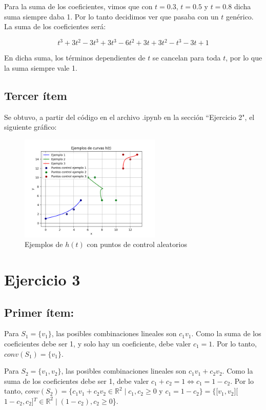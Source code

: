 \documentclass{article}
\begin{document}
Para la suma de los coeficientes, vimos que con $t=0.3$, $t=0.5$ y $t=0.8$ dicha suma siempre daba 1. Por lo tanto decidimos ver que pasaba con un $t$ genérico. La suma de los coeficientes será:

$$
t^3 + 3t^2-3t^3 + 3t^3-6t^2+3t +3t^2-t^3-3t+1
$$

En dicha suma, los términos dependientes de $t$ se cancelan para toda $t$, por lo que la suma siempre vale 1.

\subsection*{Tercer ítem}
Se obtuvo, a partir del código en el archivo .ipynb en la sección ``Ejercicio 2", el siguiente gráfico:

\begin{figure}[H]
    \centering
    \includegraphics[width=0.6\textwidth]{imagenes/graf_2c.png}
    \caption{Ejemplos de $h(t)$ con puntos de control aleatorios}
    \label{fig:ejemplo}
\end{figure}

\section*{Ejercicio 3}

\subsection*{Primer ítem:}
Para $S_1 = \{v_1\}$, las posibles combinaciones lineales son $c_1 v_1$. Como la suma de los coeficientes debe ser 1, y solo hay un coeficiente, debe valer $c_1 = 1$. Por lo tanto, $conv(S_1) = \{v_1\}$.
 
Para $S_2 = \{v_1, v_2\}$, las posibles combinaciones lineales son $c_1 v_1 + c_2 v_2$. Como la suma de los coeficientes debe ser 1, debe valer $c_1 + c_2= 1 \iff c_1 = 1 - c_2$. Por lo tanto, $conv(S_2) = \{c_1 v_1+ c_2 v_2 \in \mathbb{R}^2 \mid c_1, c_2 \geq 0$ y $ c_1 = 1- c_2\} = \{$[$v_1, v_2$][$1-c_2, c_2$]$^T \in \mathbb{R}^2 \mid (1 - c_2), c_2 \geq 0$\}.
\end{document}
